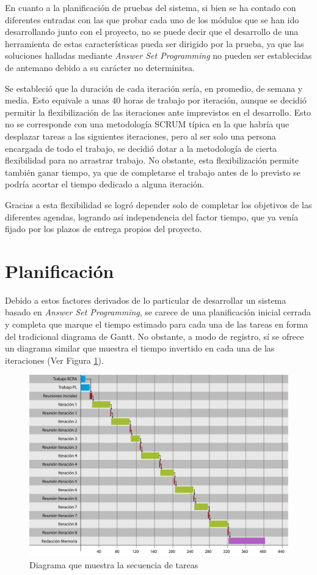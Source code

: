 En cuanto a la planificación de pruebas del sistema, si bien se ha contado con diferentes entradas con las que probar cada uno de los módulos que se han ido desarrollando junto con el proyecto, no se puede decir que el desarrollo de una herramienta de estas características pueda ser dirigido por la prueba, ya que las soluciones halladas mediante \textit{Answer Set Programming} no pueden ser establecidas de antemano debido a su carácter no determinitsa.

Se estableció que la duración de cada iteración sería, en promedio, de semana y media. Esto equivale a unas 40 horas de trabajo por iteración, aunque se decidió permitir la flexibilización de las iteraciones ante imprevistos en el desarrollo. Esto no se corresponde con una metodología SCRUM típica en la que habría que desplazar tareas a las siguientes iteraciones, pero al ser solo una persona encargada de todo el trabajo, se decidió dotar a la metodología de cierta flexibilidad para no arrastrar trabajo. No obstante, esta flexibilización permite también ganar tiempo, ya que de completarse el trabajo antes de lo previsto se podría acortar el tiempo dedicado a alguna iteración.

Gracias a esta flexibilidad se logró depender solo de completar los objetivos de las diferentes agendas, logrando así independencia del factor tiempo, que ya venía fijado por los plazos de entrega propios del proyecto. 

\section{Planificación}
\label{sec:planning}
Debido a estos factores derivados de lo particular de desarrollar un sistema basado en \textit{Answer Set Programming}, se carece de una planificación inicial cerrada y completa que marque el tiempo estimado para cada una de las tareas en forma del tradicional diagrama de Gantt. No obstante, a modo de registro, sí se ofrece un diagrama similar que muestra el tiempo invertido en cada una de las iteraciones (Ver Figura \ref{fig:tareas}).

\begin{figure}
	\centering
	\includegraphics[width=0.8\linewidth]{imagenes/diagrama_tareas.pdf}
	\caption{Diagrama que muestra la secuencia de tareas}
	\label{fig:tareas}
\end{figure}

